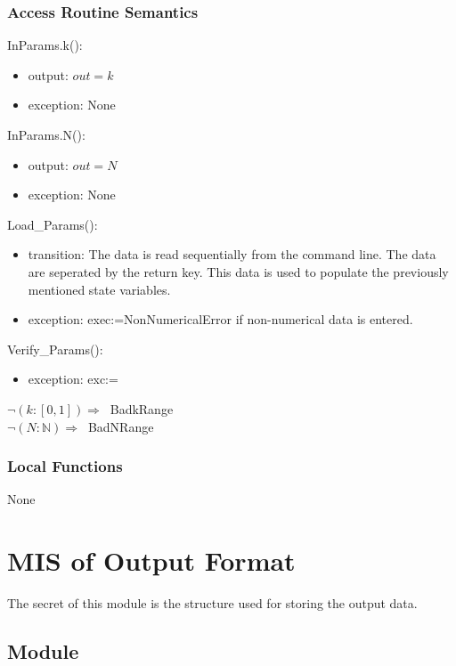 \documentclass[12pt, titlepage]{article}
\begin{document}
\subsubsection{Access Routine Semantics}

\noindent InParams.k():
\begin{itemize}
\item output: $out = k$
\item exception: None
\end{itemize}

\noindent InParams.N():
\begin{itemize}
	\item output: $out = N$
	\item exception: None
\end{itemize}

\noindent Load\_Params():
\begin{itemize}
	\item transition: The data is read sequentially from the command line. The 
	data are seperated by the return key. This data is used to populate the 
	previously mentioned state variables. 
	\item exception: exec:=NonNumericalError if non-numerical data is entered. 
\end{itemize} 

\noindent Verify\_Params():
\begin{itemize}
	\item exception: exc:=
\end{itemize}  

\noindent $\neg (k : [0,1]) \Rightarrow \ $ BadkRange\\
$\neg (N : \mathbb{N}) \Rightarrow \ $ BadNRange

\subsubsection{Local Functions}
None
\newpage

\section{MIS of Output Format} \label{OFM}

The secret of this module is the structure used for storing the output data.

\subsection{Module}
\end{document}

